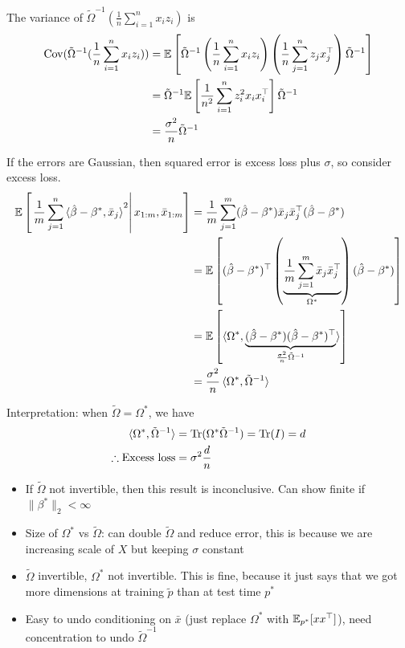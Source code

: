   The variance of $\tilde{\Omega}^{-1}\left( \frac{1}{n} \sum_{i=1}^n x_i z_i \right)$ is
  \begin{align}
    \operatorname{Cov}(\tilde{\Omega}^{-1}( \frac{1}{n} \sum_{i=1}^n x_i z_i ))
  &= \mathbb{E}\left[
    \tilde{\Omega}^{-1} \left(
      \frac{1}{n} \sum_{i=1}^n x_i z_i
      \right) \left(
      \frac{1}{n} \sum_{j=1}^n z_j x_j^\top
    \right) \tilde{\Omega}^{-1}
  \right] \\
  &= \tilde{\Omega}^{-1} \mathbb{E}\left[
    \frac{1}{n^2} \sum_{i=1}^n z_i^2 x_i x_i^\top
  \right] \tilde{\Omega}^{-1} \\
  &= \frac{\sigma^2}{n} \tilde{\Omega}^{-1}
\end{align}


If the errors are Gaussian, then squared error is excess loss plus $\sigma$,
so consider excess loss.
\begin{align}
  \mathbb{E} \left[\left.
      \frac{1}{m}
      \sum_{j=1}^n \braket{\hat{\beta} - \beta^*, \bar{x}_j}^2
      \right\vert x_{1:m}, \bar{x}_{1:m}
    \right]
  &= \frac{1}{m} \sum_{j=1}^m (\hat{\beta} - \beta^*) \bar{x}_j \bar{x}_j^\top (\hat{\beta} - \beta^*) \\
  &= \mathbb{E}\left[
    (\hat{\beta} - \beta^*)^\top
    \left(
      \underbrace{\frac{1}{m} \sum_{j=1}^m \bar{x}_j \bar{x}_j^\top}_{\Omega^*}
    \right)
    (\hat{\beta} - \beta^*)
  \right] \\
  &= \mathbb{E}\left[
    \braket{\Omega^*, \underbrace{(\hat\beta - \beta^*) (\hat\beta - \beta^*)^\top}_{\frac{\sigma^2}{n} \tilde{\Omega}^{-1}}}
  \right] \\
  &= \frac{\sigma^2}{n} \braket{\Omega^*, \tilde{\Omega}^{-1}}
\end{align}

Interpretation: when $\tilde{\Omega} = \Omega^*$, we have
\begin{align}
  \braket{\Omega^*, \tilde{\Omega}^{-1}}
  &= \operatorname{Tr}(\Omega^* \tilde{\Omega}^{-1})
  = \operatorname{Tr}(I)
  = d \\
  \therefore \text{Excess loss}
  &= \sigma^2 \frac{d}{n}
\end{align}

\begin{itemize}
  \item If $\tilde{\Omega}$ not invertible, then this result is inconclusive.
    Can show finite if $\|\beta^*\|_2 < \infty$
  \item Size of $\Omega^*$ vs $\tilde{\Omega}$: can double $\tilde{\Omega}$ and
    reduce error, this is because we are increasing scale of $X$
    but keeping $\sigma$ constant
  \item $\tilde{\Omega}$ invertible, $\Omega^*$ not invertible. This is
    fine, because it just says that we got more dimensions
    at training $\tilde{p}$ than at test time $p^*$
  \item Easy to undo conditioning on $\bar{x}$ (just replace $\Omega^*$ with
    $\mathbb{E}_{p^*}[x x^\top]$), need concentration to undo $\tilde{\Omega}^{-1}$
\end{itemize}


